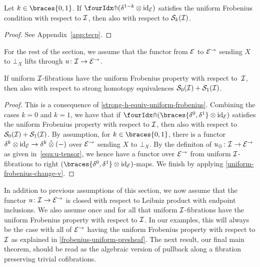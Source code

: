 \documentclass[reqno,10pt,a4paper,oneside,draft]{amsart}
\begin{document}
\begin{lemma} \label{strong-h-equiv-uniform-frobenius}
Let $k \in \braces{0, 1}$.
If $\liftr{(\kcylinv \otimes \id_\catE)}$ satisfies the uniform Frobenius condition with respect to $\cal{I}$, then also with respect to $\cal{S}_k(\cal{I})$.
\end{lemma}

\begin{proof}
See Appendix~\ref{app:tecp}.
\end{proof}

For the rest of the section, we assume that the functor from $\cal{E}$ to $\cal{E}^\to$ sending $X$ to $\bot_X$ lifts through $u \co \cal{I} \to \cal{E}^\to$.

\begin{proposition} \label{strong-h-equiv-uniform-frobenius-fibrations}
If uniform $\cal{I}$-fibrations have the uniform Frobenius property with respect to~$\cal{I}$, then also with respect to strong homotopy equivalences $\cal{S}_0(\cal{I}) + \cal{S}_1(\cal{I})$.
\end{proposition}

\begin{proof}
This is a consequence of \cref{strong-h-equiv-uniform-frobenius}.
Combining the cases $k = 0$ and $k = 1$, we have that if $\liftr{(\braces{\lcyl, \rcyl} \otimes \id_\catE)}$ satisfies the uniform Frobenius property with respect to $\cal{I}$, then also with respect to $\cal{S}_0(\cal{I}) + \cal{S}_1(\cal{I})$.
By assumption, for $k \in \braces{0, 1}$, there is a functor $\delta^k \otimes \id_\catE \to \delta^k \hatotimes (-)$ over $\catE^\to$ sending $X$ to $\bot_X$.
By the definiton of $u_\otimes \co \cal{I} \to \catE^\to$ as given in~\eqref{equ:u-tensor}, we hence have a functor over $\catE^\to$ from uniform $\cal{I}$-fibrations to right $(\braces{\lcyl, \rcyl} \otimes \id_\catE)$-maps.
We finish by applying \cref{uniform-frobenius-change-v}.
\end{proof}

In addition to previous assumptions of this section, we now assume that the functor $u \co \cal{I} \to \catE^\to$ is closed with respect to Leibniz product with endpoint inclusions.
We also assume once and for all that uniform $\cal{I}$-fibrations have the uniform Frobenius property with respect to $\cal{I}$.
In our examples, this will always be the case with all of $\catE^\to$ having the uniform Frobenius property with respect to $\cal{I}$ as explained in \cref{frobenius-uniform-presheaf}.
The next result, our final main theorem, should be read as the algebraic version of pullback along a fibration preserving trivial cofibrations.
\end{document}
